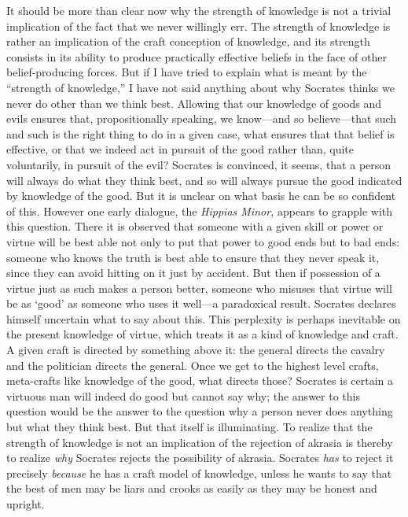 \documentclass[11pt]{amsart}
\begin{document}
It should be more than clear now why the strength of knowledge is not a trivial implication of the fact that we never willingly err. The strength of knowledge is rather an implication of the craft conception of knowledge, and its strength consists in its ability to produce practically effective beliefs in the face of other belief-producing forces. But if I have tried to explain what is meant by the ``strength of knowledge,'' I have not said anything about why Socrates thinks we never do other than we think best. Allowing that our knowledge of goods and evils ensures that, propositionally speaking, we know---and so believe---that such and such is the right thing to do in a given case, what ensures that that belief is effective, or that we indeed act in pursuit of the good rather than, quite voluntarily, in pursuit of the evil? Socrates is convinced, it seems, that a person will always do what they think best, and so will always pursue the good indicated by knowledge of the good. But it is unclear on what basis he can be so confident of this. However one early dialogue, the \emph{Hippias Minor,} appears to grapple with this question. There it is observed that someone with a given skill or power or virtue will be best able not only to put that power to good ends but to bad ends: someone who knows the truth is best able to ensure that they never speak it, since they can avoid hitting on it just by accident. But then if possession of a virtue just as such makes a person better, someone who misuses that virtue will be as `good' as someone who uses it well---a paradoxical result. Socrates declares himself uncertain what to say about this. This perplexity is perhaps inevitable on the present knowledge of virtue, which treats it as a kind of knowledge and craft. A given craft is directed by something above it: the general directs the cavalry and the politician directs the general. Once we get to the highest level crafts, meta-crafts like knowledge of the good, what directs those? Socrates is certain a virtuous man will indeed do good but cannot say why; the answer to this question would be the answer to the question why a person never does anything but what they think best. But that itself is illuminating. To realize that the strength of knowledge is not an implication of the rejection of akrasia is thereby to realize \emph{why} Socrates rejects the possibility of akrasia. Socrates \emph{has} to reject it precisely \emph{because} he has a craft model of knowledge, unless he wants to say that the best of men may be liars and crooks as easily as they may be honest and upright.
\end{document}
